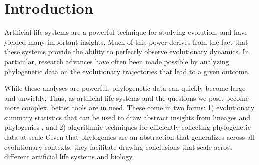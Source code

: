\section{Introduction} \label{sec:introduction}

Artificial life systems are a powerful technique for studying evolution, and have yielded many important insights. %
Much of this power derives from the fact that these systems provide the ability to perfectly observe evolutionary dynamics. 
In particular, research advances have often been made possible by analyzing phylogenetic data on the evolutionary trajectories that lead to a given outcome. %

While these analyses are powerful, phylogenetic data can quickly become large and unwieldy. Thus, as artificial life systems and the questions we posit become more complex, better tools are in need. These come in two forms: 1) evolutionary summary statistics that can be used to draw abstract insights from lineages and phylogenies \citep{dolsonInterpretingTapeLife2020}, and 2) algorithmic techniques for efficiently collecting phylogenetic data at scale \citep{morenoHereditaryStratigraphyGenome2022} Given that phylogenies are an abstraction that generalizes across all evolutionary contexts, they facilitate drawing conclusions that scale across different artificial life systems and biology. 



